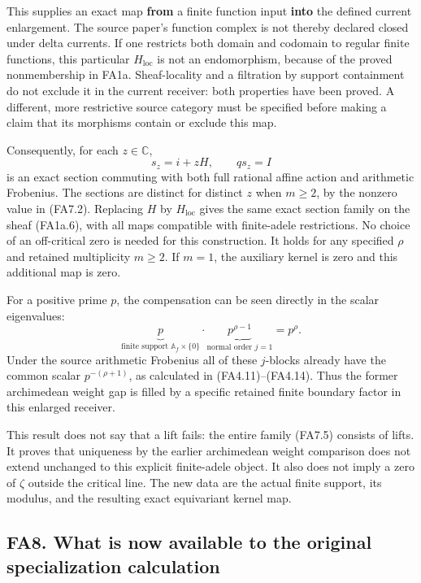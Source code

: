 This supplies an exact map \textbf{from} a finite function input
\textbf{into} the defined current enlargement. The source paper's
function complex is not thereby declared closed under delta currents. If
one restricts both domain and codomain to regular finite functions, this
particular \(H_{\mathrm{loc}}\) is not an endomorphism, because of the
proved nonmembership in FA1a. Sheaf-locality and a filtration by support
containment do not exclude it in the current receiver: both properties
have been proved. A different, more restrictive source category must be
specified before making a claim that its morphisms contain or exclude
this map.

Consequently, for each \(z\in\mathbb C\), \[
 \boxed{s_z=i+zH,\qquad q s_z=I}
\tag{FA7.5}
\] is an exact section commuting with both full rational affine action
and arithmetic Frobenius. The sections are distinct for distinct \(z\)
when \(m\ge2\), by the nonzero value in (FA7.2). Replacing \(H\) by
\(H_{\mathrm{loc}}\) gives the same exact section family on the sheaf
(FA1a.6), with all maps compatible with finite-adele restrictions. No
choice of an off-critical zero is needed for this construction. It holds
for any specified \(\rho\) and retained multiplicity \(m\ge2\). If
\(m=1\), the auxiliary kernel is zero and this additional map is zero.

For a positive prime \(p\), the compensation can be seen directly in the
scalar eigenvalues: \[
 \underbrace{p}_{\text{finite support }\mathbb A_f\times\{0\}}
 \cdot
 \underbrace{p^{\rho-1}}_{\text{normal order }j=1}
       =p^\rho.
\tag{FA7.6}
\] Under the source arithmetic Frobenius all of these \(j\)-blocks
already have the common scalar \(p^{-(\rho+1)}\), as calculated in
(FA4.11)--(FA4.14). Thus the former archimedean weight gap is filled by
a specific retained finite boundary factor in this enlarged receiver.

This result does not say that a lift fails: the entire family (FA7.5)
consists of lifts. It proves that uniqueness by the earlier archimedean
weight comparison does not extend unchanged to this explicit
finite-adele object. It also does not imply a zero of \(\zeta\) outside
the critical line. The new data are the actual finite support, its
modulus, and the resulting exact equivariant kernel map.

\subsection{FA8. What is now available to the original specialization
calculation}\label{fa8.-what-is-now-available-to-the-original-specialization-calculation}

